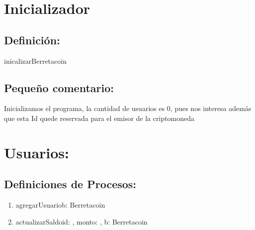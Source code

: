 \documentclass[10pt,a4paper]{article}
\begin{document}
\section{Inicializador}

\subsection{Definición:}

\begin{proc}{inicalizarBerretacoin}{}

    \requiere{}

\end{proc}

\subsection{Pequeño comentario: }

Inicializamos el programa, la cantidad de usuarios es 0, pues nos interesa además que esta Id quede reservada para el emisor de la criptomoneda

\section{Usuarios: }

\subsection{Definiciones de Procesos: }

\begin{enumerate}
    \item 
        \begin{proc}{agregarUsuario}{\Inout b: Berretacoin}{}


        \end{proc}

    \item 
        \begin{proc}{actualizarSaldo}{\In id: \ent, \In monto: \ent, \Inout b: Berretacoin}
        
    
        \end{proc}

\end{enumerate}
\end{document}
